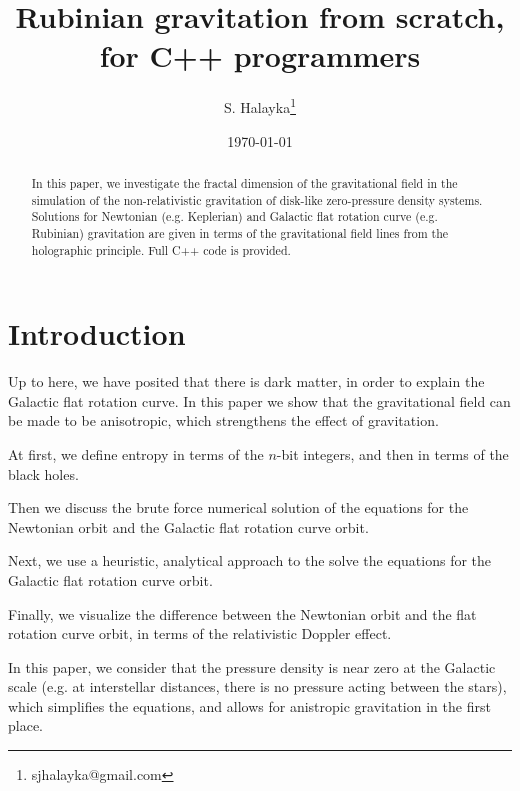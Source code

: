 \documentclass[12pt]{article}
\title{Rubinian gravitation from scratch, for C++ programmers}
\author{S. Halayka\footnote{sjhalayka@gmail.com}}
\date{\today\;\currenttime}
\begin{document}
 
\maketitle

\begin{abstract}

In this paper, we investigate the fractal dimension of the gravitational field in the simulation of the non-relativistic gravitation of disk-like zero-pressure density systems.
Solutions for Newtonian (e.g. Keplerian) and Galactic flat rotation curve (e.g. Rubinian) gravitation are given in terms of the gravitational field lines from the holographic principle.
Full C++ code is provided.
\end{abstract}



\section{Introduction}

Up to here, we have posited that there is dark matter, in order to explain the Galactic flat rotation curve.
In this paper we show that the gravitational field can be made to be anisotropic, which strengthens the effect of gravitation.

At first, we define entropy in terms of the $n$-bit integers, and then in terms of the black holes.

Then we discuss the brute force numerical solution of the equations for the Newtonian orbit and the Galactic flat rotation curve orbit.

Next, we use a heuristic, analytical approach to the solve the equations for the Galactic flat rotation curve orbit.

Finally, we visualize the difference between the Newtonian orbit and the flat rotation curve orbit, in terms of the relativistic Doppler effect.

In this paper, we consider that the pressure density is near zero at the Galactic scale (e.g. at interstellar distances, there is no pressure acting between the stars), which simplifies the equations, and allows for anistropic gravitation in the first place.
\end{document}
